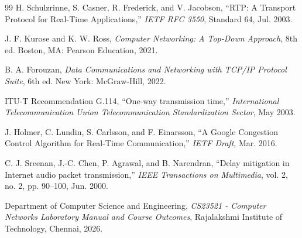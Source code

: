 \documentclass[12pt, a4paper]{report}
\begin{document}
\newpage
\begin{thebibliography}{99}
H. Schulzrinne, S. Casner, R. Frederick, and V. Jacobson, ``RTP: A Transport Protocol for Real-Time Applications,'' \emph{IETF RFC 3550}, Standard 64, Jul. 2003.

J. F. Kurose and K. W. Ross, \emph{Computer Networking: A Top-Down Approach}, 8th ed. Boston, MA: Pearson Education, 2021.

B. A. Forouzan, \emph{Data Communications and Networking with TCP/IP Protocol Suite}, 6th ed. New York: McGraw-Hill, 2022.

ITU-T Recommendation G.114, ``One-way transmission time,'' \emph{International Telecommunication Union Telecommunication Standardization Sector}, May 2003.

J. Holmer, C. Lundin, S. Carlsson, and F. Einarsson, ``A Google Congestion Control Algorithm for Real-Time Communication,'' \emph{IETF Draft}, Mar. 2016.

C. J. Sreenan, J.-C. Chen, P. Agrawal, and B. Narendran, ``Delay mitigation in Internet audio packet transmission,'' \emph{IEEE Transactions on Multimedia}, vol. 2, no. 2, pp. 90--100, Jun. 2000.

Department of Computer Science and Engineering, \emph{CS23521 - Computer Networks Laboratory Manual and Course Outcomes}, Rajalakshmi Institute of Technology, Chennai, 2026.
\end{thebibliography}
\end{document}
